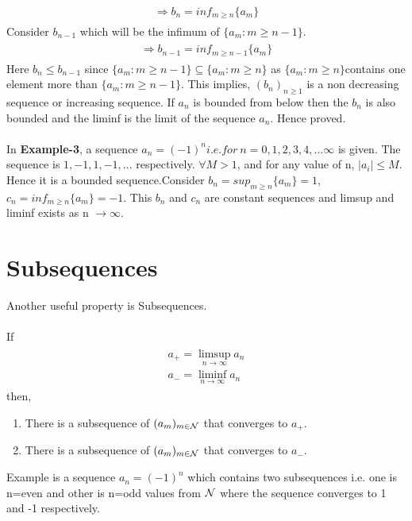 \documentclass[a4paper]{article}
\begin{document}
\begin{align}
\begin{split}
\Rightarrow b_n = inf_{m\geq n} \{a_m\}
\end{split}
\end{align}
Consider $b_{n-1}$ which will be the infimum of $\{a_m:m\geq n-1\}$.
\begin{align}
\begin{split}
\Rightarrow b_{n-1} = inf_{m\geq n-1} \{a_m\}
\end{split}
\end{align}
Here $b_n \leq b_{n-1}$ since $\{a_m:m\geq n-1\} \subseteq \{a_m:m\geq n\}$ as $\{a_m:m\geq n\}$contains one element more than $\{a_m:m\geq n-1\}$. This implies, $(b_n)_{n\geq 1}$ is a non decreasing sequence or increasing sequence. If $a_n$ is bounded from below then the $b_n$ is also bounded and the liminf is the limit of the sequence $a_n$. Hence proved.
\\
\\
In \textbf{Example-3}, a sequence $a_n=(-1)^n i.e. for\ n=0, 1 ,2,3,4,...\infty$ is given. The sequence is $1,-1,1,-1,...$ respectively. $\forall M > 1$, and for any value of n, $\mid a_i \mid \leq M $. Hence it is a bounded sequence.Consider $b_n = sup_{m\geq n} \{a_m\} =1$, $c_n = inf_{m\geq n} \{a_m\} =-1$. This $b_n$ and $c_n$ are constant sequences and limsup and liminf exists as n $\to \infty$.
\\
\section{Subsequences}
Another useful property is Subsequences.\\
\\
If 
\begin{align}
\begin{split}
a_+ = \limsup_{n \to \infty} a_n\\
a_- = \liminf_{n \to \infty} a_n
\end{split}
\end{align} then,\\
\begin{enumerate}
	\item There is a subsequence of $(a_m)_{m \in \mathcal N}$ that converges to $a_+$.
	\item There is a subsequence of $(a_m)_{m \in \mathcal N}$ that converges to $a_-$.
\end{enumerate}
Example is a sequence $a_n=(-1)^n$ which contains two subsequences i.e. one is n=even and other is n=odd values from $\mathcal N$ where the sequence converges to 1 and -1 respectively. 
\end{document}
